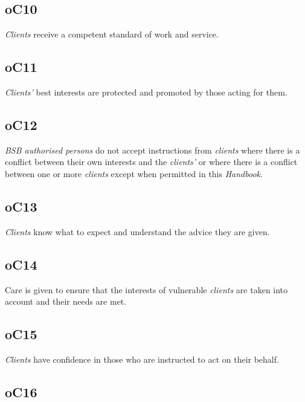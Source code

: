 




\subsection{\color{bleu}oC10}

\emph{Clients} receive a competent standard of work and service.

\subsection{\color{bleu}oC11}

\emph{Clients'} best interests are protected and promoted by those
acting for them.

\subsection{\color{bleu}oC12}

\emph{BSB authorised persons} do not accept instructions from
\emph{clients} where there is a conflict between their own interests and
the \emph{clients'} or where there is a conflict between one or more
\emph{clients} except when permitted in this \emph{Handbook}.

\subsection{\color{bleu}oC13}

\emph{Clients} know what to expect and understand the advice they are
given.

\subsection{\color{bleu}oC14}

Care is given to ensure that the interests of vulnerable \emph{clients}
are taken into account and their needs are met.

\subsection{\color{bleu}oC15}

\emph{Clients} have confidence in those who are instructed to act on
their behalf.

\subsection{\color{bleu}oC16}

